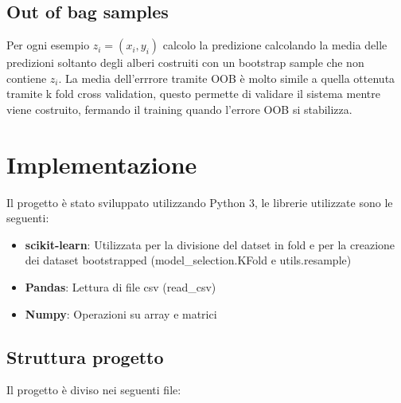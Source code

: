\documentclass{article}
\begin{document}
    \subsection{Out of bag samples}
    Per ogni esempio $z_i = (x_i, y_i)$ calcolo la predizione calcolando
    la media delle predizioni soltanto degli alberi costruiti con un 
    bootstrap sample che non contiene $z_i$. La media dell'errrore tramite OOB è molto simile
    a quella ottenuta tramite k fold cross validation, questo permette di validare il 
    sistema mentre viene costruito, fermando il training quando l'errore OOB si stabilizza.


    \newpage
    \section{Implementazione}
    Il progetto è stato sviluppato utilizzando Python 3, le librerie utilizzate sono le seguenti:
    \begin{itemize}
        \item  \textbf{scikit-learn}: Utilizzata per la divisione del datset in fold e per la creazione
        dei dataset bootstrapped (model\_selection.KFold e utils.resample)
        \item  \textbf{Pandas}: Lettura di file csv (read\_csv)
        \item  \textbf{Numpy}: Operazioni su array e matrici
    \end{itemize}

    \subsection{Struttura progetto}

    Il progetto è diviso nei seguenti file:
\end{document}
